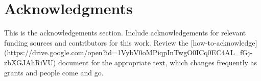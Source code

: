 \section{Acknowledgments}
This is the acknowledgements section.
Include acknowledgements for relevant funding sources and contributors for
this work. Review the [how-to-acknowledge](https://drive.google.com/open?id=1VybV0oMPiqpInTwgO0ICq0EC4AL_fGj-zbXGJAhRiVU)
document for the appropriate text, which changes frequently as grants and people
come and go.
